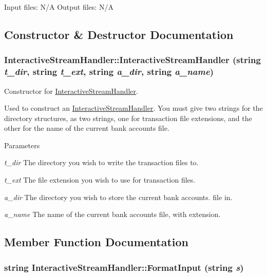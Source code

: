 Input files: N/A Output files: N/A 

\subsection{Constructor \& Destructor Documentation}
\hypertarget{classInteractiveStreamHandler_a84581012cff489309399cba0068975fd}{
\subsubsection[{InteractiveStreamHandler}]{\setlength{\rightskip}{0pt plus 5cm}InteractiveStreamHandler::InteractiveStreamHandler (string {\em t\_\-dir}, \/  string {\em t\_\-ext}, \/  string {\em a\_\-dir}, \/  string {\em a\_\-name})}}
\label{classInteractiveStreamHandler_a84581012cff489309399cba0068975fd}


Constructor for \hyperlink{classInteractiveStreamHandler}{InteractiveStreamHandler}. 

Used to construct an \hyperlink{classInteractiveStreamHandler}{InteractiveStreamHandler}. You must give two strings for the directory structures, as two strings, one for transaction file extensions, and the other for the name of the current bank accounts file.


\begin{DoxyParams}{Parameters}
\item[{\em t\_\-dir}]The directory you wish to write the transaction files to.\item[{\em t\_\-ext}]The file extension you wish to use for transaction files.\item[{\em a\_\-dir}]The directory you wish to store the current bank accounts. file in.\item[{\em a\_\-name}]The name of the current bank accounts file, with extension. \end{DoxyParams}


\subsection{Member Function Documentation}
\hypertarget{classInteractiveStreamHandler_aa372b2a79eb1e88222fdae1f8d58b46b}{
\subsubsection[{FormatInput}]{\setlength{\rightskip}{0pt plus 5cm}string InteractiveStreamHandler::FormatInput (string {\em s})}}
\label{classInteractiveStreamHandler_aa372b2a79eb1e88222fdae1f8d58b46b}


